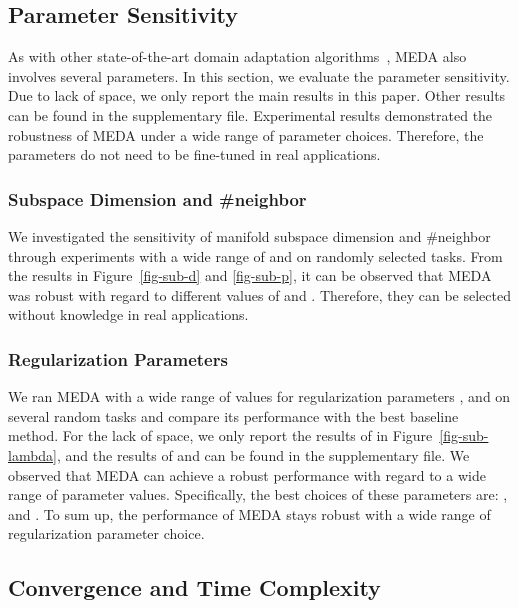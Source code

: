 \documentclass[sigconf]{acmart}
\begin{document}
\subsection{Parameter Sensitivity}
\label{sec-para}

As with other state-of-the-art domain adaptation algorithms~\cite{zhang2017joint,long2014adaptation,ghifary2017scatter}, MEDA also involves several parameters. In this section, we evaluate the parameter sensitivity. Due to lack of space, we only report the main results in this paper. Other results can be found in the supplementary file. Experimental results demonstrated the robustness of MEDA under a wide range of parameter choices. Therefore, the parameters do not need to be fine-tuned in real applications.

\subsubsection{Subspace Dimension and \#neighbor}

We investigated the sensitivity of manifold subspace dimension  and \#neighbor  through experiments with a wide range of  and  on randomly selected tasks. From the results in Figure~\ref{fig-sub-d} and \ref{fig-sub-p}, it can be observed that MEDA was robust with regard to different values of  and . Therefore, they can be selected without knowledge in real applications. 

\subsubsection{Regularization Parameters}

We ran MEDA with a wide range of values for regularization parameters , and  on several random tasks and compare its performance with the best baseline method. For the lack of space, we only report the results of  in Figure~\ref{fig-sub-lambda}, and the results of  and  can be found in the supplementary file. We observed that MEDA can achieve a robust performance with regard to a wide range of parameter values. Specifically, the best choices of these parameters are: , and . To sum up, the performance of MEDA stays robust with a wide range of regularization parameter choice. 

\subsection{Convergence and Time Complexity}
\label{sec-conver}
\end{document}
